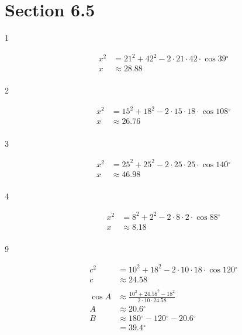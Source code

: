 \documentclass{exam}
\newcommand{\dg}{\ensuremath{^\circ}}
\begin{document}
  \section{Section 6.5}

  \ifprintanswers

    \begin{description}

      \item[1] 
        \begin{align*}
          x^2 & = 21^2 + 42^2 - 2 \cdot 21 \cdot 42 \cdot \cos 39 \dg \\
          x   & \approx \boxed{ 28.88 } \\
        \end{align*}

      \item[2] 
        \begin{align*}
          x^2 & = 15^2 + 18^2 - 2 \cdot 15 \cdot 18 \cdot \cos 108 \dg \\
          x   & \approx \boxed{ 26.76 } \\
        \end{align*}

      \item[3] 
        \begin{align*}
          x^2 & = 25^2 + 25^2 - 2 \cdot 25 \cdot 25 \cdot \cos 140 \dg \\
          x   & \approx \boxed{ 46.98 } \\
        \end{align*}

      \item[4] 
        \begin{align*}
          x^2 & = 8^2 + 2^2 - 2 \cdot 8 \cdot 2 \cdot \cos 88 \dg \\
          x   & \approx \boxed{ 8.18 } \\
        \end{align*}

      \item[9] 
        \begin{align*}
          c^2 & = 10^2 + 18^2 - 2 \cdot 10 \cdot 18 \cdot \cos 120 \dg \\
          c   & \approx \boxed{ 24.58 } \\
          \\
          \cos A & \approx \frac{ 10^2 + 24.58^2 - 18^2}{2 \cdot 10 \cdot 24.58} \\
          A      & \approx \boxed{ 20.6 \dg }
          \\
          B & \approx 180 \dg - 120 \dg - 20.6 \dg \\
            & = \boxed{ 39.4 \dg } \\
        \end{align*}


\end{description}
\end{document}

